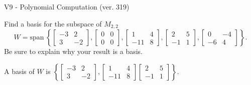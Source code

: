 \begin{exercise}
  \begin{exerciseTitle}V9 - Polynomial Computation (ver. 319)\end{exerciseTitle}
  \begin{exerciseStatement}
    Find a basis for the subspace of \(M_{2,2}\) 
\[W=\mathrm{span}\ \left\{\left[\begin{array}{cc}
-3 & 2 \\
3 & -2
\end{array}\right] , \left[\begin{array}{cc}
0 & 0 \\
0 & 0
\end{array}\right] , \left[\begin{array}{cc}
1 & 4 \\
-11 & 8
\end{array}\right] , \left[\begin{array}{cc}
2 & 5 \\
-1 & 1
\end{array}\right] , \left[\begin{array}{cc}
0 & -4 \\
-6 & 4
\end{array}\right]\right\}.\]
 Be sure to explain why your result is a basis.


  \end{exerciseStatement}
  \begin{exerciseAnswer}
   A basis of \(W\) is  \(\left\{\left[\begin{array}{cc}
-3 & 2 \\
3 & -2
\end{array}\right] , \left[\begin{array}{cc}
1 & 4 \\
-11 & 8
\end{array}\right] \left[\begin{array}{cc}
2 & 5 \\
-1 & 1
\end{array}\right]\right\}\).
  


  \end{exerciseAnswer}
\end{exercise}